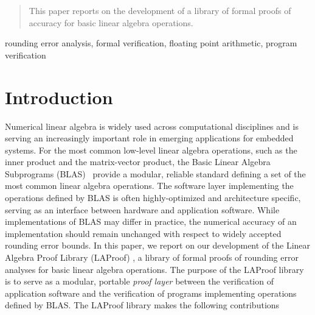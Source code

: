 \documentclass[conference]{IEEEtran}
\begin{document}
\begin{abstract}
This paper reports on the development of a library of formal proofs of accuracy for basic linear algebra operations. 
\end{abstract}

\begin{IEEEkeywords}
rounding error analysis, formal verification, floating point arithmetic, program verification
\end{IEEEkeywords}

\section{Introduction}\label{sec:introduction}
Numerical linear algebra is widely used across computational disciplines and is serving an increasingly important role in emerging applications for embedded systems. For the most common low-level linear algebra operations, such as the inner product and the matrix-vector product, the Basic Linear Algebra Subprograms (BLAS)~\cite{blas02,blast} provide a modular, reliable standard defining a set of the most common linear algebra operations. The software layer implementing the operations defined by BLAS is often highly-optimized and architecture specific, serving as an interface between hardware and application software. While implementations of BLAS may differ in practice, the numerical accuracy of an implementation should remain unchanged with respect to widely accepted rounding error bounds. In this paper, we report on our development of the Linear Algebra Proof Library (LAProof) , a library of formal proofs of rounding error analyses for basic linear algebra operations. The purpose of the LAProof library is to serve as a modular, portable \emph{proof layer} between the verification of application software and the verification of programs implementing operations defined by BLAS. The LAProof library makes the following contributions 
\end{document}

